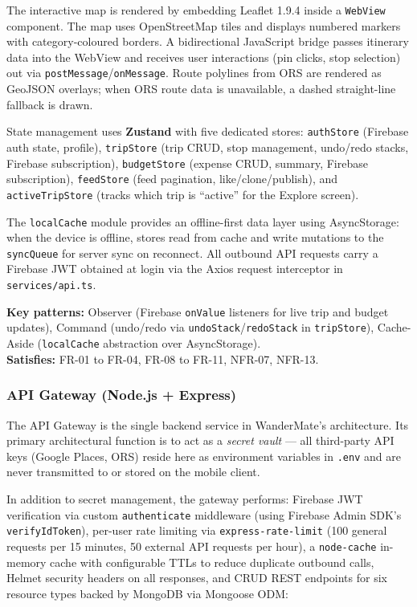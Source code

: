\documentclass[12pt, a4paper]{article}
\begin{document}
The interactive map is rendered by embedding Leaflet 1.9.4 inside a \texttt{WebView} component. The map uses OpenStreetMap tiles and displays numbered markers with category-coloured borders. A bidirectional JavaScript bridge passes itinerary data into the WebView and receives user interactions (pin clicks, stop selection) out via \texttt{postMessage}/\texttt{onMessage}. Route polylines from ORS are rendered as GeoJSON overlays; when ORS route data is unavailable, a dashed straight-line fallback is drawn.

State management uses \textbf{Zustand} with five dedicated stores: \texttt{authStore} (Firebase auth state, profile), \texttt{tripStore} (trip CRUD, stop management, undo/redo stacks, Firebase subscription), \texttt{budgetStore} (expense CRUD, summary, Firebase subscription), \texttt{feedStore} (feed pagination, like/clone/publish), and \texttt{activeTripStore} (tracks which trip is ``active'' for the Explore screen).

The \texttt{localCache} module provides an offline-first data layer using AsyncStorage: when the device is offline, stores read from cache and write mutations to the \texttt{syncQueue} for server sync on reconnect. All outbound API requests carry a Firebase JWT obtained at login via the Axios request interceptor in \texttt{services/api.ts}.

\begin{tcolorbox}[notebox]
  \textbf{Key patterns:} Observer (Firebase \texttt{onValue} listeners for live trip and budget updates), Command (undo/redo via \texttt{undoStack}/\texttt{redoStack} in \texttt{tripStore}), Cache-Aside (\texttt{localCache} abstraction over AsyncStorage).\\[2pt]
  \textbf{Satisfies:} FR-01 to FR-04, FR-08 to FR-11, NFR-07, NFR-13.
\end{tcolorbox}

\subsubsection{API Gateway (Node.js + Express)}

The API Gateway is the single backend service in WanderMate's architecture. Its primary architectural function is to act as a \emph{secret vault} --- all third-party API keys (Google Places, ORS) reside here as environment variables in \texttt{.env} and are never transmitted to or stored on the mobile client.

In addition to secret management, the gateway performs: Firebase JWT verification via custom \texttt{authenticate} middleware (using Firebase Admin SDK's \texttt{verifyIdToken}), per-user rate limiting via \texttt{express-rate-limit} (100 general requests per 15 minutes, 50 external API requests per hour), a \texttt{node-cache} in-memory cache with configurable TTLs to reduce duplicate outbound calls, Helmet security headers on all responses, and CRUD REST endpoints for six resource types backed by MongoDB via Mongoose ODM:
\end{document}
